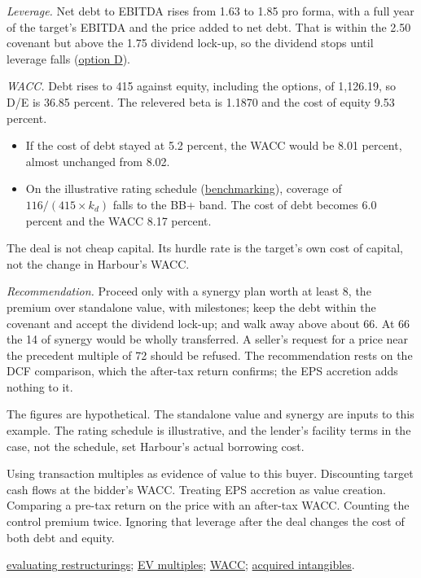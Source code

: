 \begin{qfexample}
\emph{Leverage.} Net debt to EBITDA rises from 1.63 to 1.85 pro forma, with a full year of the target's EBITDA and the price added to net debt. That is within the 2.50 covenant but above the 1.75 dividend lock-up, so the dividend stops until leverage falls (\hyperref[ex:integrated-credit-decision]{option D}).

\emph{WACC.} Debt rises to 415 against equity, including the options, of 1,126.19, so D/E is 36.85 percent. The relevered beta is 1.1870 and the cost of equity 9.53 percent.
\begin{itemize}
\item If the cost of debt stayed at 5.2 percent, the WACC would be 8.01 percent, almost unchanged from 8.02.
\item On the illustrative rating schedule (\hyperref[meth:capital-structure-benchmarking]{benchmarking}), coverage of $116/(415\times k_d)$ falls to the BB+ band. The cost of debt becomes 6.0 percent and the WACC 8.17 percent.
\end{itemize}
The deal is not cheap capital. Its hurdle rate is the target's own cost of capital, not the change in Harbour's WACC.

\emph{Recommendation.} Proceed only with a synergy plan worth at least 8, the premium over standalone value, with milestones; keep the debt within the covenant and accept the dividend lock-up; and walk away above about 66. At 66 the 14 of synergy would be wholly transferred. A seller's request for a price near the precedent multiple of 72 should be refused. The recommendation rests on the DCF comparison, which the after-tax return confirms; the EPS accretion adds nothing to it.

 The figures are hypothetical. The standalone value and synergy are inputs to this example. The rating schedule is illustrative, and the lender's facility terms in the case, not the schedule, set Harbour's actual borrowing cost.

 Using transaction multiples as evidence of value to this buyer. Discounting target cash flows at the bidder's WACC. Treating EPS accretion as value creation. Comparing a pre-tax return on the price with an after-tax WACC. Counting the control premium twice. Ignoring that leverage after the deal changes the cost of both debt and equity.

 \hyperref[meth:restructuring-evaluation]{evaluating restructurings}; \hyperref[meth:enterprise-value-multiples]{EV multiples}; \hyperref[meth:wacc-calculation]{WACC}; \hyperref[meth:intangible-acquisition-routes]{acquired intangibles}.

\end{qfexample}
